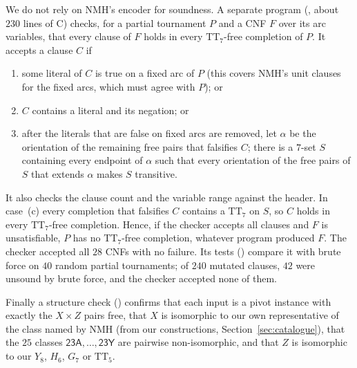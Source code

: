 \documentclass[11pt]{amsart}
\theoremstyle{definition}
\theoremstyle{remark}
\newcommand{\TT}[1]{\mathrm{TT}_{#1}}
\newcommand{\cl}[1]{\textsf{#1}}
\begin{document}
We do not rely on NMH's encoder for soundness. A separate program
(, about $230$ lines of C) checks, for a partial
tournament $P$ and a CNF $F$ over its arc variables, that every clause of $F$
holds in every $\TT{7}$-free completion of $P$. It accepts a clause $C$ if
\begin{enumerate}[label=(\alph*)]
\item some literal of $C$ is true on a fixed arc of $P$ (this covers NMH's
  unit clauses for the fixed arcs, which must agree with $P$); or
\item $C$ contains a literal and its negation; or
\item after the literals that are false on fixed arcs are removed, let
  $\alpha$ be the orientation of the remaining free pairs that falsifies $C$;
  there is a $7$-set $S$ containing every endpoint of $\alpha$ such that every
  orientation of the free pairs of $S$ that extends $\alpha$ makes $S$
  transitive.
\end{enumerate}
It also checks the clause count and the variable range against the header.
In case~(c) every completion that falsifies $C$ contains a $\TT{7}$ on $S$, so
$C$ holds in every $\TT{7}$-free completion. Hence, if the checker accepts all
clauses and $F$ is unsatisfiable, $P$ has no $\TT{7}$-free completion,
whatever program produced $F$. The checker accepted all $28$ CNFs with no
failure. Its tests () compare it with brute force
on $40$ random partial tournaments; of $240$ mutated clauses, $42$ were unsound
by brute force, and the checker accepted none of them.

Finally a structure check () confirms that
each input is a pivot instance with exactly the $X \times Z$ pairs free, that
$X$ is isomorphic to our own representative of the class named by NMH (from
our constructions, Section~\ref{sec:catalogue}), that the $25$ classes
$\cl{23A},\dots,\cl{23Y}$ are pairwise non-isomorphic, and that $Z$ is
isomorphic to our $Y_8$, $H_6$, $G_7$ or $\TT{5}$.
\end{document}
